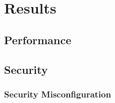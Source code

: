 
\chapter{Results}\label{cha:results}

\section{Performance}

















\section{Security}
\subsection{Security Misconfiguration}
